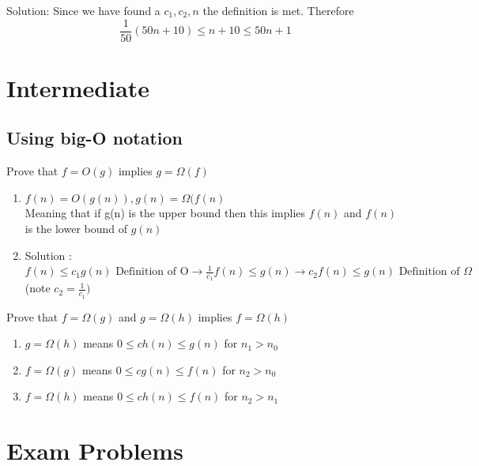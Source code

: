 \documentclass[11pt,fleqn]{book}
\begin{document}
\color{blue} Solution: Since we have found a $c_1, c_2, n$ the definition is met. Therefore $$\frac{1}{50}(50n + 10) \leq n + 10 \leq 50n + 1 $$ \color{black}
\section{Intermediate}
\subsection{Using big-O notation}
\begin{example}
 Prove that $f = O(g)$ implies $g = \Omega(f)$
\end{example}
\begin{enumerate}
    \item $f(n) = O(g(n)), g(n) = \Omega(f(n)$\\ Meaning that if g(n) is the upper bound then this implies $f(n)$ and $f(n)$ is the lower bound of $g(n)$ 
    \item \color{blue} Solution : $f(n) \leq c_1 g(n) \text{ Definition of O} \rightarrow \frac{1}{c_1} f(n) \leq g(n) \rightarrow c_2 f(n) \leq g(n) \text{ Definition of } \Omega$\\ (note $c_2 = \frac{1}{c_1})$\color{black} 
\end{enumerate}
\begin{example}
Prove that $f = \Omega(g)$ and $g = \Omega(h)$ implies $f = \Omega(h)$ 
\end{example}
\begin{enumerate}
    \item $g = \Omega(h)$ means $0 \leq ch(n) \leq g(n)$ for $n_1 > n_0$
    \item $f = \Omega(g)$ means $0 \leq cg(n) \leq f(n)$ for $n_2 > n_0$
    \item $f = \Omega(h)$ means $0 \leq ch(n) \leq f(n)$ for $n_2 > n_1$
\end{enumerate}
\section{Exam Problems} 
\end{document}
